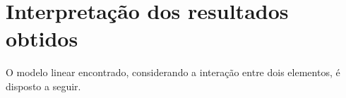 



% 
\section*{Interpretação dos resultados obtidos}
O modelo linear encontrado, considerando a interação entre dois elementos, é disposto a seguir.

